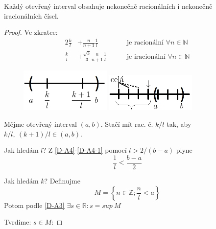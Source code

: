 \begin{theorem}
Každý otevřený interval obsahuje nekonečně racionálních i nekonečně iracionálních čísel.
\end{theorem}
\begin{proof}
	Ve zkratce:
	\begin{alignat}{2}
		\frac{k}{l}&+\frac{n}{n+1}\frac{1}{l} &&\quad\text{ je racionální }\forall n\in\mathbb{N} \\
		\frac{k}{l}&+\frac{\sqrt{3}}{3}\frac{n}{n+1}\frac{1}{l} &&\quad\text{ je iracionální }\forall n\in\mathbb{N}
	\end{alignat}
	\begin{figure}[ht!]
		\begin{center}
			\includegraphics[width=0.4\textwidth,keepaspectratio]{../img/chapter1/interval.png}
			\includegraphics[width=0.4\textwidth,keepaspectratio]{../img/chapter1/interval2.png}
		\end{center}
	\end{figure}\FloatBarrier
	
	Mějme otevřený interval $(a,b)$. Stačí mít rac. č. $k/l$ tak, aby \\$k/l,~(k+1)/l\in(a,b)$.
	
	Jak hledám $l$? Z \autoref*{D-A4}-\autoref{D-A4-1} pomocí $l>2/(b-a)$ plyne
	\begin{equation}
		\frac{1}{l}<\frac{b-a}{2}
	\end{equation}
	
	Jak hledám $k$? Definujme
	\begin{equation}
		M=\left\{n\in\mathbb{Z};\frac{n}{l}<a\right\}
	\end{equation}
	Potom podle \autoref{D-A3} $\exists s\in\mathbb{R}:s=sup~M$

	Tvrdíme: $s\in M$:


\end{proof}
